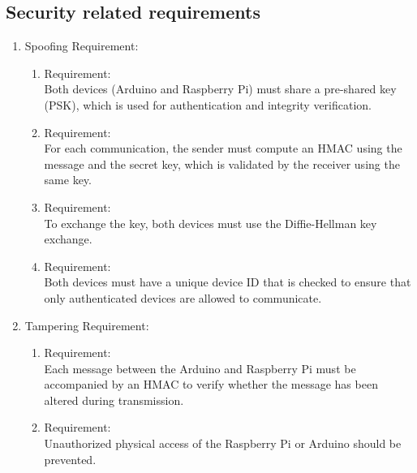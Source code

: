 \subsection{Security related requirements}
    \begin{enumerate}[label*=\arabic*.]
        \item \label{sreq.1} Spoofing Requirement:  \\
        \begin{enumerate}[label*=\arabic*.]
			\item \label{req.6.1.1}  Requirement:  \\
             Both devices (Arduino and Raspberry Pi) must share a pre-shared key (PSK), which is used for authentication and integrity verification.\\  
			\item \label{req.6.1.2}  Requirement:  \\
            For each communication, the sender must compute an HMAC using the message and the secret key, which is validated by the receiver using the same key. \\
			\item \label{req.6.1.3}  Requirement:  \\
			To exchange the key, both devices must use the Diffie-Hellman key exchange.\\ 
			\item \label{req.6.1.4}  Requirement:  \\
		    Both devices must have a unique device ID that is checked to ensure that only authenticated devices are allowed to communicate.\\  
	  \end{enumerate}
        
        \item \label{sreq.2} Tampering Requirement:  \\
        \begin{enumerate}[label*=\arabic*.]
			\item \label{req.6.2.1}  Requirement:  \\
            Each message between the Arduino and Raspberry Pi must be accompanied by an HMAC to verify whether the message has been altered during transmission. \\
			\item \label{req.6.2.2}  Requirement:  \\
            Unauthorized physical access of the Raspberry Pi or Arduino should be prevented.\\
	  \end{enumerate}
        

\end{enumerate}
